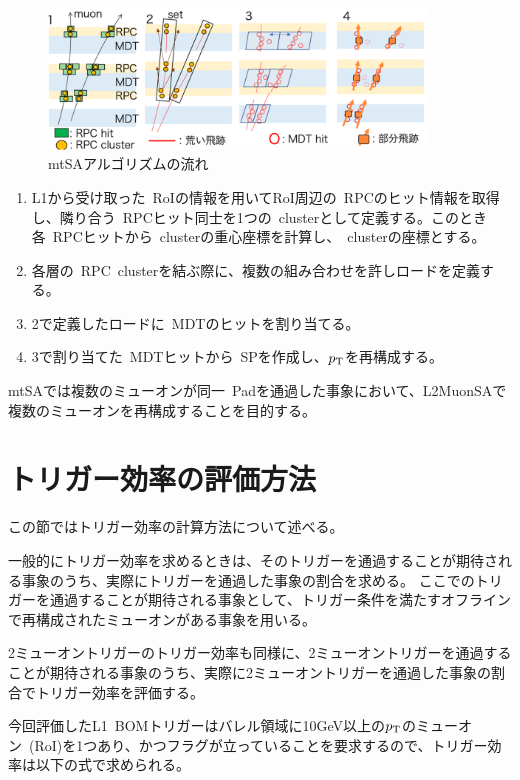 \begin{figure}[H]
    \centering
    \includegraphics[clip, width=10cm]{fig/4/mtSA_alg.png}
    \caption{mtSAアルゴリズムの流れ\cite{article:taniguchi}}
    \label{fig:4-3}
\end{figure}

\begin{enumerate}
    \item L1から受け取った~RoIの情報を用いてRoI周辺の~RPCのヒット情報を取得し、隣り合う~RPCヒット同士を1つの~clusterとして定義する。このとき各~RPCヒットから~clusterの重心座標を計算し、~clusterの座標とする。
    \item 各層の~RPC~clusterを結ぶ際に、複数の組み合わせを許しロードを定義する。
    \item 2で定義したロードに~MDTのヒットを割り当てる。
    \item 3で割り当てた~MDTヒットから~SPを作成し、$p_{\rm{T}}$を再構成する。
\end{enumerate}

mtSAでは複数のミューオンが同一~Padを通過した事象において、L2MuonSAで複数のミューオンを再構成することを目的する。

\section{トリガー効率の評価方法}\label{chapter4-2}
この節ではトリガー効率の計算方法について述べる。

一般的にトリガー効率を求めるときは、そのトリガーを通過することが期待される事象のうち、実際にトリガーを通過した事象の割合を求める。
ここでのトリガーを通過することが期待される事象として、トリガー条件を満たすオフラインで再構成されたミューオンがある事象を用いる。

2ミューオントリガーのトリガー効率も同様に、2ミューオントリガーを通過することが期待される事象のうち、実際に2ミューオントリガーを通過した事象の割合でトリガー効率を評価する。

今回評価したL1~BOMトリガーはバレル領域に10GeV以上の$p_\mathrm{T}$のミューオン~(RoI)を1つあり、かつフラグが立っていることを要求するので、トリガー効率は以下の式で求められる。

